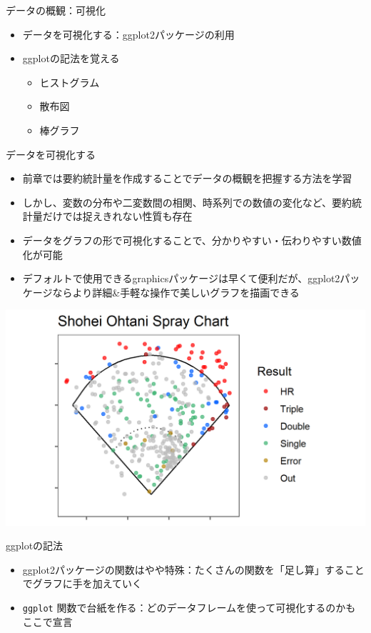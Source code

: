 \documentclass[
  ignorenonframetext,
]{beamer}
\providecommand{\tightlist}{%
  \setlength{\itemsep}{0pt}\setlength{\parskip}{0pt}}
\begin{document}
\begin{frame}[fragile]{データの概観：可視化}
\protect\hypertarget{ux30c7ux30fcux30bfux306eux6982ux89b3ux53efux8996ux5316}{}
\begin{itemize}
\tightlist
\item
  データを可視化する：ggplot2パッケージの利用
\item
  ggplotの記法を覚える

  \begin{itemize}
  \tightlist
  \item
    ヒストグラム
  \item
    散布図
  \item
    棒グラフ
  \end{itemize}
\end{itemize}

\begin{block}{データを可視化する}
\protect\hypertarget{ux30c7ux30fcux30bfux3092ux53efux8996ux5316ux3059ux308b}{}
\begin{itemize}
\tightlist
\item
  前章では要約統計量を作成することでデータの概観を把握する方法を学習
\item
  しかし、変数の分布や二変数間の相関、時系列での数値の変化など、要約統計量だけでは捉えきれない性質も存在
\item
  データをグラフの形で可視化することで、分かりやすい・伝わりやすい数値化が可能
\item
  デフォルトで使用できるgraphicsパッケージは早くて便利だが、ggplot2パッケージならより詳細\&手軽な操作で美しいグラフを描画できる
\end{itemize}

\begin{center}\includegraphics[width=0.5\linewidth]{figs/Ohtani_spray_total} \end{center}
\end{block}

\begin{block}{ggplotの記法}
\protect\hypertarget{ggplotux306eux8a18ux6cd5}{}
\begin{itemize}
\tightlist
\item
  ggplot2パッケージの関数はやや特殊：たくさんの関数を「足し算」することでグラフに手を加えていく
\item
  \texttt{ggplot}
  関数で台紙を作る：どのデータフレームを使って可視化するのかもここで宣言
\end{itemize}


\end{block}
\end{frame}
\end{document}
